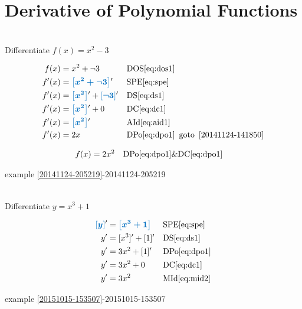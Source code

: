 \documentclass[20150903-160354-rs2.2-MarksMathNotebook.tex]{subfiles}
\begin{document}
\section{Derivative of Polynomial Functions}



\begin{example}[id:20141124-152503] \label{20141124-152503} \hfill \\

Differentiate $f(x)=x^2-3$

\soln

\solnsteps
\begin{align*}
f(x) &= x^2 + \neg 3 && \text{DOS} \eqref{eq:dos1} \\
f'(x) &= \farg{x^2 + \neg 3}' && \text{SPE} \eqref{eq:spe} \\
f'(x) &= \farg{x^2}' + \farg{\neg 3}' && \text{DS} \eqref{eq:ds1} \\
f'(x) &= \farg{x^2}' + 0 && \text{DC} \eqref{eq:dc1} \\
f'(x) &= \farg{x^2}' && \text{AId} \eqref{eq:aid1} \\
f'(x) &= 2x && \text{DPo} \eqref{eq:dpo1}  \text{\, goto \,}  \ref{20141124-141850}
\end{align*}

\soln

\lesssteps

\begin{align*}
f(x) & = 2x^2 && \text{DPo} \eqref{eq:dpo1} \& \text{DC} \eqref{eq:dpo1}
\end{align*}

\qdepend

\qdependlist

example \ref{20141124-205219}-20141124-205219

\end{example}

\begin{example}[id:20151015-155838] \label{20151015-155838} \hfill \\
Differentiate $y=x^3+1$

\soln

\solnsteps
\begin{align*}
\farg{y}' &= \farg{x^3+1} && \text{SPE} \eqref{eq:spe} \\
y' &= [x^3]' + [1]' && \text{DS} \eqref{eq:ds1} \\
y' &= 3x^2 + [1]' && \text{DPo} \eqref{eq:dpo1} \\
y' &= 3x^2 + 0 && \text{DC} \eqref{eq:dc1} \\
y' &= 3x^2 && \text{MId} \eqref{eq:mid2} 
\end{align*}

\qdepend

\qdependlist
example \ref{20151015-153507}-20151015-153507

\end{example}
\end{document}
